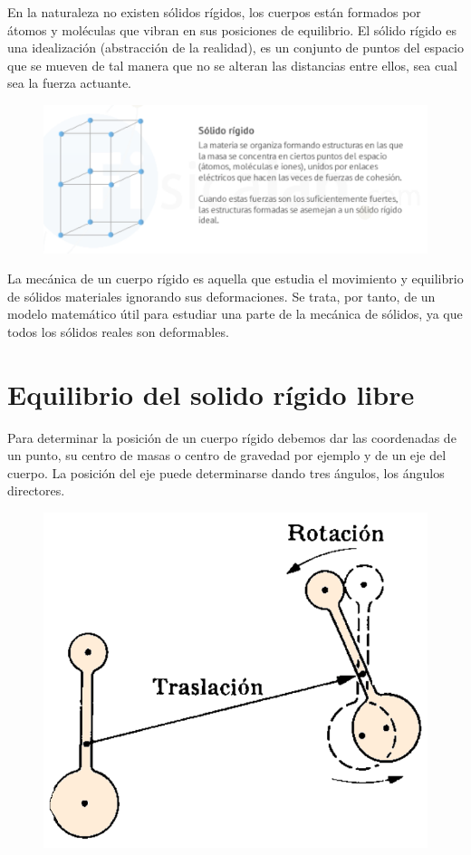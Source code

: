 En la naturaleza no existen sólidos rígidos, los cuerpos están formados por átomos y moléculas que vibran en sus posiciones de equilibrio. El sólido rígido es una idealización (abstracción de la realidad), es un conjunto de puntos del espacio que se mueven de tal manera que no se alteran las distancias entre ellos, sea cual sea la fuerza actuante.

\begin{figure}[H]
	\centering
	\includegraphics[width=1\textwidth]{imagenes/imagenes06/T06IM03.png}
\end{figure}

La mecánica de un cuerpo rígido es aquella que estudia el movimiento y equilibrio de sólidos materiales ignorando sus deformaciones. Se trata, por tanto, de un modelo matemático útil para estudiar una parte de la mecánica de sólidos, ya que todos los sólidos reales son deformables. 

\section{Equilibrio del solido rígido libre}

\vspace{30mm} %
\begin{multicols}{2}
Para determinar la posición de un cuerpo rígido debemos dar las coordenadas de un punto, su centro de masas o centro de gravedad por ejemplo y de un eje del cuerpo. La posición del eje puede determinarse dando tres ángulos, los ángulos directores.

\begin{figure}[H]
	\centering
	\includegraphics[width=.4\textwidth]{imagenes/imagenes06/T06IM04.png}
\end{figure}
\end{multicols}

